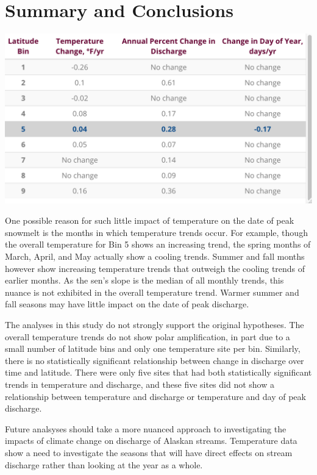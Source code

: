 \documentclass[12pt,]{article}
\begin{document}
\newpage

\hypertarget{summary-and-conclusions}{%
\section{Summary and Conclusions}\label{summary-and-conclusions}}

\includegraphics[width=1\linewidth]{../FIGURES/Summary_Table}

One possible reason for such little impact of temperature on the date of
peak snowmelt is the months in which temperature trends occur. For
example, though the overall temperature for Bin 5 shows an increasing
trend, the spring months of March, April, and May actually show a
cooling trends. Summer and fall months however show increasing
temperature trends that outweigh the cooling trends of earlier months.
As the sen's slope is the median of all monthly trends, this nuance is
not exhibited in the overall temperature trend. Warmer summer and fall
seasons may have little impact on the date of peak discharge.

The analyses in this study do not strongly support the original
hypotheses. The overall temperature trends do not show polar
amplification, in part due to a small number of latitude bins and only
one temperature site per bin. Similarly, there is no statistically
significant relationship between change in discharge over time and
latitude. There were only five sites that had both statistically
significant trends in temperature and discharge, and these five sites
did not show a relationship between temperature and discharge or
temperature and day of peak discharge.

Future analsyses should take a more nuanced approach to investigating
the impacts of climate change on discharge of Alaskan streams.
Temperature data show a need to investigate the seasons that will have
direct effects on stream discharge rather than looking at the year as a
whole.
\end{document}
